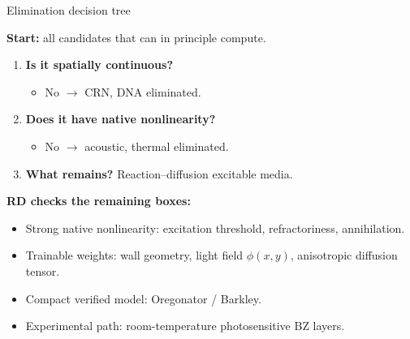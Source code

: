 \documentclass[aspectratio=169,11pt]{beamer}
\begin{document}
\begin{frame}{Elimination decision tree}

\textbf{Start:} all candidates that can in principle compute.

\vspace{0.2cm}
\begin{enumerate}
    \item \textbf{Is it spatially continuous?}
    \begin{itemize}
        \item No $\rightarrow$ CRN, DNA eliminated.
    \end{itemize}
    \item \textbf{Does it have native nonlinearity?}
    \begin{itemize}
        \item No $\rightarrow$ acoustic, thermal eliminated.
    \end{itemize}
    \item \textbf{What remains?} Reaction--diffusion excitable media.
\end{enumerate}

\vspace{0.3cm}
\textbf{RD checks the remaining boxes:}
\begin{itemize}
    \item Strong native nonlinearity: excitation threshold, refractoriness, annihilation.
    \item Trainable weights: wall geometry, light field $\phi(x,y)$, anisotropic diffusion tensor.
    \item Compact verified model: Oregonator / Barkley.
    \item Experimental path: room-temperature photosensitive BZ layers.
\end{itemize}

\end{frame}
\end{document}
